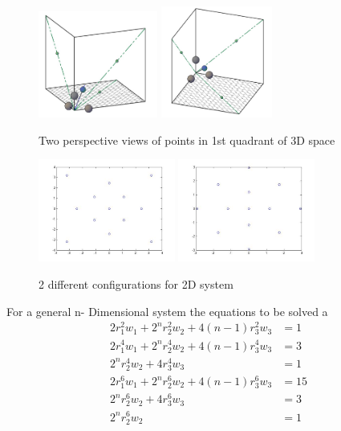 \documentclass{article}
\begin{document}
\begin{figure}[h]
	\centering
		\includegraphics[width=0.35\textwidth]{3d6thmom.jpg}
	  \includegraphics[width=0.325\textwidth]{3d6thmom2.jpg}
	\caption{Two perspective views of points in 1st quadrant of 3D space}
	\label{fig:3d2}
\end{figure}
\begin{figure}[h]
	\centering
	\includegraphics[width=0.4\textwidth]{2dcorr6thmomentpts.jpg}
	\includegraphics[width=0.4\textwidth]{2d_weird_case2.jpg}
	\caption{2 different configurations for 2D system}
	\label{fig:2dconfigs}
\end{figure}
 For a general n- Dimensional system the equations to be solved a
 \begin{align*}
 2r_1^2w_1+2^nr_2^2w_2+4(n-1)r_3^2w_3&=1\\
 2r_1^4w_1+2^nr_2^4w_2+4(n-1)r_3^4w_3&=3\\
 2^nr_2^4w_2+4r_3^4w_3&=1\\
 2r_1^6w_1+2^nr_2^6w_2+4(n-1)r_3^6w_3&=15\\
 2^nr_2^6w_2+4r_3^6w_3&=3\\
 2^nr_2^6w_2&=1
 \end{align*}\newline\newline\newline
\end{document}
